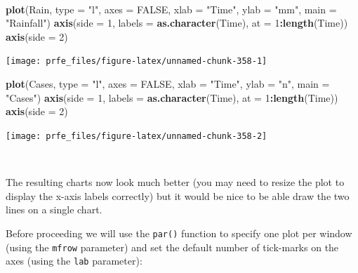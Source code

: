 \documentclass[12pt,a4paper]{book}
\newenvironment{Shaded}{\begin{snugshade}}{\end{snugshade}}
\newcommand{\KeywordTok}[1]{\textcolor[rgb]{0.13,0.29,0.53}{\textbf{#1}}}
\newcommand{\DataTypeTok}[1]{\textcolor[rgb]{0.13,0.29,0.53}{#1}}
\newcommand{\DecValTok}[1]{\textcolor[rgb]{0.00,0.00,0.81}{#1}}
\newcommand{\StringTok}[1]{\textcolor[rgb]{0.31,0.60,0.02}{#1}}
\newcommand{\OtherTok}[1]{\textcolor[rgb]{0.56,0.35,0.01}{#1}}
\newcommand{\OperatorTok}[1]{\textcolor[rgb]{0.81,0.36,0.00}{\textbf{#1}}}
\newcommand{\NormalTok}[1]{#1}
\theoremstyle{definition}
\theoremstyle{definition}
\theoremstyle{definition}
\theoremstyle{remark}
\begin{document}
~

\begin{Shaded}
\begin{Highlighting}[]
\KeywordTok{plot}\NormalTok{(Rain, }\DataTypeTok{type =} \StringTok{"l"}\NormalTok{, }\DataTypeTok{axes =} \OtherTok{FALSE}\NormalTok{, }\DataTypeTok{xlab =} \StringTok{"Time"}\NormalTok{, }\DataTypeTok{ylab =} \StringTok{"mm"}\NormalTok{, }\DataTypeTok{main =} \StringTok{"Rainfall"}\NormalTok{)}
\KeywordTok{axis}\NormalTok{(}\DataTypeTok{side =} \DecValTok{1}\NormalTok{, }\DataTypeTok{labels =} \KeywordTok{as.character}\NormalTok{(Time), }\DataTypeTok{at =} \DecValTok{1}\OperatorTok{:}\KeywordTok{length}\NormalTok{(Time))}
\KeywordTok{axis}\NormalTok{(}\DataTypeTok{side =} \DecValTok{2}\NormalTok{)}
\end{Highlighting}
\end{Shaded}

\begin{center}\texttt{[image: prfe\_files/figure-latex/unnamed-chunk-358-1]} \end{center}

\begin{Shaded}
\begin{Highlighting}[]
\KeywordTok{plot}\NormalTok{(Cases, }\DataTypeTok{type =} \StringTok{"l"}\NormalTok{, }\DataTypeTok{axes =} \OtherTok{FALSE}\NormalTok{, }\DataTypeTok{xlab =} \StringTok{"Time"}\NormalTok{, }\DataTypeTok{ylab =} \StringTok{"n"}\NormalTok{, }\DataTypeTok{main =} \StringTok{"Cases"}\NormalTok{)}
\KeywordTok{axis}\NormalTok{(}\DataTypeTok{side =} \DecValTok{1}\NormalTok{, }\DataTypeTok{labels =} \KeywordTok{as.character}\NormalTok{(Time), }\DataTypeTok{at =} \DecValTok{1}\OperatorTok{:}\KeywordTok{length}\NormalTok{(Time))}
\KeywordTok{axis}\NormalTok{(}\DataTypeTok{side =} \DecValTok{2}\NormalTok{)}
\end{Highlighting}
\end{Shaded}

\begin{center}\texttt{[image: prfe\_files/figure-latex/unnamed-chunk-358-2]} \end{center}

~

The resulting charts now look much better (you may need to resize the
plot to display the x-axis labels correctly) but it would be nice to be
able draw the two lines on a single chart.

Before proceeding we will use the \texttt{par()} function to specify one
plot per window (using the \texttt{mfrow} parameter) and set the default
number of tick-marks on the axes (using the \texttt{lab} parameter):
\end{document}
